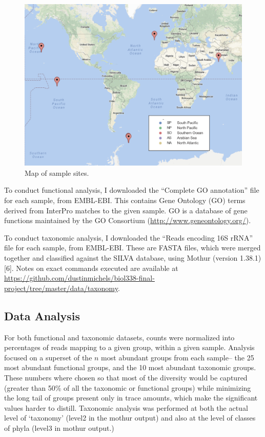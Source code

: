 \documentclass[12pt,a4paper,]{article}
\begin{document}
\begin{figure}
\centering
\includegraphics{imgs/map.png}
\caption{Map of sample sites.\label{fig:map}}
\end{figure}

To conduct functional analysis, I downloaded the ``Complete GO
annotation'' file for each sample, from EMBL-EBI. This contains Gene
Ontology (GO) terms derived from InterPro matches to the given sample.
GO is a database of gene functions maintained by the GO Consortium
(\url{http://www.geneontology.org/}).

To conduct taxonomic analysis, I downloaded the ``Reads encoding 16S
rRNA'' file for each sample, from EMBL-EBI. These are FASTA files, which
were merged together and classified against the SILVA database, using
Mothur (version 1.38.1) {[}6{]}. Notes on exact commands executed are
available at
\url{https://github.com/dustinmichels/biol338-final-project/tree/master/data/taxonomy}.

\subsection{Data Analysis}\label{data-analysis}

For both functional and taxonomic datasets, counts were normalized into
percentages of reads mapping to a given group, within a given sample.
Analysis focused on a superset of the \(n\) most abundant groups from
each sample-- the 25 most abundant functional groups, and the 10 most
abundant taxonomic groups. These numbers where chosen so that most of
the diversity would be captured (greater than 50\% of all the taxonomic
or functional groups) while minimizing the long tail of groups present
only in trace amounts, which make the significant values harder to
distill. Taxonomic analysis was performed at both the actual level of
`taxonomy' (level2 in the mothur output) and also at the level of
classes of phyla (level3 in mothur output.)
\end{document}
